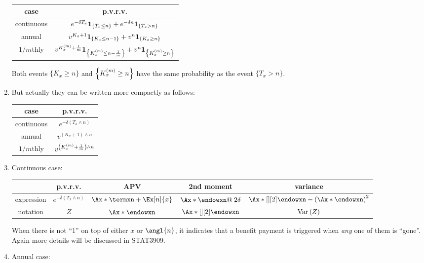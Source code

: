 \begin{enumerate}
\begin{tabular}{cc}
\toprule
case&p.v.r.v.\\
\midrule
continuous&\(e^{-\delta T_x}\mathbf{1}_{\left\{T_x\le n\right\}}+e^{-\delta n}\mathbf{1}_{\left\{T_x>n\right\}}\)\\
annual&\(v^{K_x+1}\mathbf{1}_{\left\{K_x\le n-1\right\}}+v^n\mathbf{1}_{\left\{K_x\ge n\right\}}\)\\
\(1/m\)thly&\(v^{K_x^{(m)}+\frac{1}{m}}\mathbf{1}_{\left\{K_x^{(m)}\le n-\frac{1}{m}\right\}}+v^n\mathbf{1}_{\left\{K_x^{(m)}\ge n\right\}}\)\\
\bottomrule
\end{tabular}

\begin{note}
Both events \(\{K_x\ge n\}\) and \(\qty{K_x^{(m)}\ge n}\) have the same probability as
the event \(\{T_x> n\}\).
\end{note}
\item But actually they can be written more compactly as follows:

\begin{tabular}{cc}
\toprule
case&p.v.r.v.\\
\midrule
continuous&\(e^{-\delta(T_x\wedge n)}\)\\
annual&\(v^{(K_x+1)\wedge n}\)\\
\(1/m\)thly&\(v^{\qty(K_x^{(m)}+\frac{1}{m})\wedge n}\)\\
\bottomrule
\end{tabular}
\item \label{it:cts-endow-fmlas}
Continuous case:

\begin{tabular}{ccccc}
\toprule
&p.v.r.v.&APV&2nd moment&variance\\
\midrule
expression&\(e^{-\delta(T_x\wedge n)}\)&\(\Ax*{\termxn}+\Ex[n]{x}\)
&\(\Ax*{\endowxn}@\;2\delta\)&\(\Ax*[][2]{\endowxn}-\qty(\Ax*{\endowxn})^2\)\\
notation&\(Z\)&\(\Ax*{\endowxn}\)
&\(\Ax*[][2]{\endowxn}\)
&\(\operatorname{Var}\qty(Z)\)\\
\bottomrule
\end{tabular}

\begin{note}
When there is not ``1'' on top of either \(x\) or \(\angl{n}\), it indicates
that a benefit payment is triggered when \emph{any} one of them is ``gone''.
Again more details will be discussed in STAT3909.
\end{note}

\item \label{it:annual-endow-fmlas}
Annual case:


\end{enumerate}
